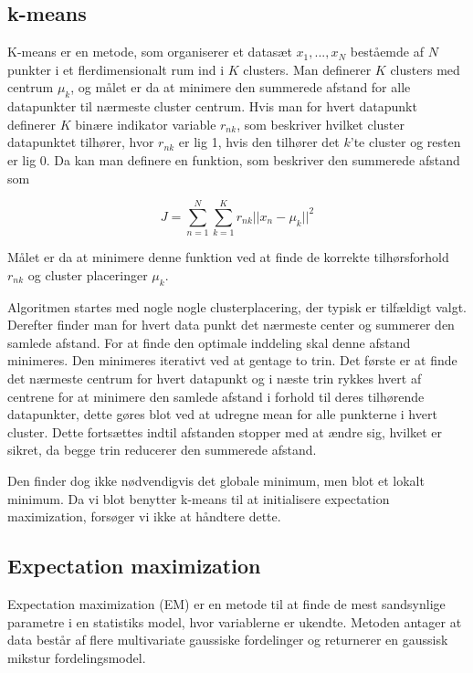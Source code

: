 

\subsection{k-means}

K-means er en metode, som organiserer et datasæt ${x_1,...,x_N}$ beståemde
af $N$ punkter i et flerdimensionalt rum ind i $K$ clusters. Man definerer
$K$ clusters med centrum $\mu_k$, og målet er da at minimere den summerede
afstand for alle datapunkter til nærmeste cluster centrum. Hvis man for hvert
datapunkt definerer $K$ binære indikator variable $r_{nk}$, som beskriver
hvilket cluster datapunktet tilhører, hvor $r_{nk}$ er lig 1, hvis den tilhører
det $k$'te cluster og resten er lig 0. Da kan man definere en funktion, som
beskriver den summerede afstand som

$$
J = \sum_{n=1}^{N} \sum_{k=1}^{K} r_{nk} || x_n - \mu_k ||^2
$$

Målet er da at minimere denne funktion ved at finde de korrekte tilhørsforhold
$r_{nk}$ og cluster placeringer $\mu_k$. 

Algoritmen startes med nogle nogle clusterplacering, der typisk er tilfældigt
valgt. Derefter finder man for hvert data punkt det nærmeste center og
summerer den samlede afstand. For at finde den optimale inddeling skal denne
afstand minimeres. Den minimeres iterativt ved at gentage to trin. Det første
er at finde det nærmeste centrum for hvert datapunkt og i næste trin rykkes
hvert af centrene for at minimere den samlede afstand i forhold til deres
tilhørende datapunkter, dette gøres blot ved at udregne mean for alle
punkterne i hvert cluster. Dette fortsættes indtil afstanden stopper med at
ændre sig, hvilket er sikret, da begge trin reducerer den summerede afstand.

Den finder dog ikke nødvendigvis det globale minimum, men blot et
lokalt minimum. Da vi blot benytter k-means til at initialisere expectation
maximization, forsøger vi ikke at håndtere dette.

\subsection{Expectation maximization}

Expectation maximization (EM) er en metode til at finde de mest sandsynlige
parametre i en statistiks model, hvor variablerne er ukendte. Metoden antager
at data består af flere multivariate gaussiske fordelinger og returnerer en
gaussisk mikstur fordelingsmodel. 

